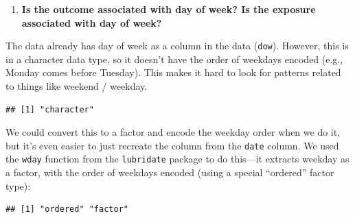 \documentclass[
]{book}
\newenvironment{Shaded}{\begin{snugshade}}{\end{snugshade}}
\newcommand{\AttributeTok}[1]{\textcolor[rgb]{0.13,0.29,0.53}{#1}}
\newcommand{\ConstantTok}[1]{\textcolor[rgb]{0.56,0.35,0.01}{#1}}
\newcommand{\FunctionTok}[1]{\textcolor[rgb]{0.13,0.29,0.53}{\textbf{#1}}}
\newcommand{\NormalTok}[1]{#1}
\newcommand{\OtherTok}[1]{\textcolor[rgb]{0.56,0.35,0.01}{#1}}
\newcommand{\SpecialCharTok}[1]{\textcolor[rgb]{0.81,0.36,0.00}{\textbf{#1}}}
\providecommand{\tightlist}{%
  \setlength{\itemsep}{0pt}\setlength{\parskip}{0pt}}
\begin{document}
\begin{enumerate}
\def\labelenumi{\arabic{enumi}.}
\setcounter{enumi}{4}
\tightlist
\item
  \textbf{Is the outcome associated with day of week? Is the exposure associated
  with day of week?}
\end{enumerate}

The data already has day of week as a column in the data (\texttt{dow}). However,
this is in a character data type, so it doesn't have the order of weekdays
encoded (e.g., Monday comes before Tuesday). This makes it hard to look for
patterns related to things like weekend / weekday.

\begin{Shaded}
\end{Shaded}

\begin{verbatim}
## [1] "character"
\end{verbatim}

We could convert this to a factor and encode the weekday order when we do
it, but it's even easier to just recreate the column from the \texttt{date} column.
We used the \texttt{wday} function from the \texttt{lubridate} package to do this---it extracts
weekday as a factor, with the order of weekdays encoded (using a special
``ordered'' factor type):

\begin{Shaded}
\end{Shaded}

\begin{verbatim}
## [1] "ordered" "factor"
\end{verbatim}

\begin{Shaded}
\end{Shaded}
\end{document}
